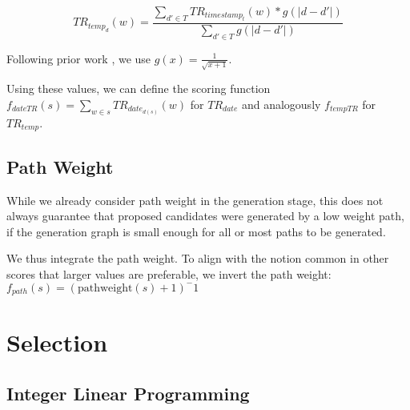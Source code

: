 \documentclass[a4paper,BCOR=10mm]{report}
\begin{document}
\begin{displaymath}
    TR_{temp_d}(w) = \frac{\sum_{d' \in T} TR_{{timestamp}_t}(w) * g(|d - d'|)}{\sum_{d' \in T} g(|d - d'|)}
\end{displaymath}

Following prior work \citep{yan}, we use $g(x) = \frac{1}{\sqrt{x + 1}}$.

Using these values, we can define the scoring function $f_{dateTR}(s) = \sum_{w \in s} TR_{date_{d(s)}}(w)$ for $TR_{date}$ and analogously $f_{tempTR}$ for $TR_{temp}$.

\subsection{Path Weight}

While we already consider path weight in the generation stage, this does not always guarantee that proposed candidates were generated by a low weight path, if the generation graph is small enough for all or most paths to be generated.

We thus integrate the path weight. To align with the notion common in other scores that larger values are preferable, we invert the path weight: $f_{path}(s) = (\text{pathweight}(s) + 1)^-1$

\section{Selection}

\subsection{Integer Linear Programming}
\end{document}
